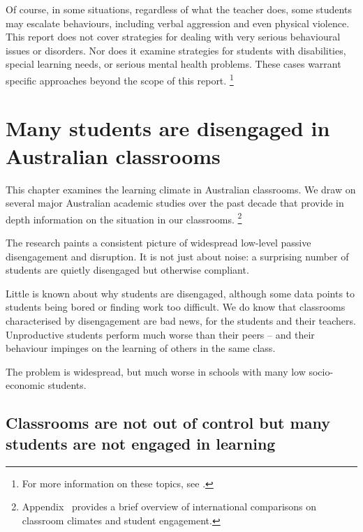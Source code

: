\documentclass[FrontPage]{grattan}
\begin{document}
Of course, in some situations, regardless of what the teacher does, some students may escalate behaviours, including verbal aggression and even physical violence. This report does not cover strategies for dealing with very serious behavioural issues or disorders. Nor does it examine strategies for students with disabilities, special learning needs, or serious mental health problems. These cases warrant specific approaches beyond the scope of this report.%
    \footnote{For more information on these topics, see \textcites{Friend2014IncludingStudentsSpecial}{Sutherland2008ExaminingInfluenceTeacher}{Walker1995AntisocialBehaviorSchool}.}
 

\chapter{Many students are disengaged in Australian classrooms }\label{chap:many-students-disengaged}
 
This chapter examines the learning climate in Australian classrooms. We draw on several major Australian academic studies over the past decade that provide in depth information on the situation in our classrooms.%
\footnote{Appendix~ provides a brief overview of international comparisons on classroom climates and student engagement.}
 
The research paints a consistent picture of widespread low-level passive disengagement and disruption. It is not just about noise: a surprising number of students are quietly disengaged but otherwise compliant.
 
Little is known about why students are disengaged, although some data points to students being bored or finding work too difficult. We do know that classrooms characterised by disengagement are bad news, for the students and their teachers. Unproductive students perform much worse than their peers – and their behaviour impinges on the learning of others in the same class. 
 
The problem is widespread, but much worse in schools with many low socio-economic students. 

\section{Classrooms are not out of control but many students are not engaged in learning}\label{sec:not-out-of-control}
\end{document}
